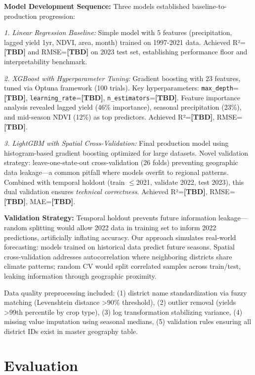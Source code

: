 \documentclass[10pt,a4paper]{article}
\begin{document}
\textbf{Model Development Sequence:}
Three models established baseline-to-production progression:

\textit{1. Linear Regression Baseline:} Simple model with 5 features (precipitation, lagged yield 1yr, NDVI, area, month) trained on 1997-2021 data. Achieved R²=\textbf{[TBD]} and RMSE=\textbf{[TBD]} on 2023 test set, establishing performance floor and interpretability benchmark.

\textit{2. XGBoost with Hyperparameter Tuning:} Gradient boosting with 23 features, tuned via Optuna framework (100 trials). Key hyperparameters: \texttt{max\_depth}=\textbf{[TBD]}, \texttt{learning\_rate}=\textbf{[TBD]}, \texttt{n\_estimators}=\textbf{[TBD]}. Feature importance analysis revealed lagged yield (46\% importance), seasonal precipitation (23\%), and mid-season NDVI (12\%) as top predictors. Achieved R²=\textbf{[TBD]}, RMSE=\textbf{[TBD]}.

\textit{3. LightGBM with Spatial Cross-Validation:} Final production model using histogram-based gradient boosting optimized for large datasets. Novel validation strategy: leave-one-state-out cross-validation (26 folds) preventing geographic data leakage—a common pitfall where models overfit to regional patterns. Combined with temporal holdout (train $\leq$2021, validate 2022, test 2023), this dual validation ensures \textit{technical correctness}. Achieved R²=\textbf{[TBD]}, RMSE=\textbf{[TBD]}, MAE=\textbf{[TBD]}.

\textbf{Validation Strategy:}
Temporal holdout prevents future information leakage—random splitting would allow 2022 data in training set to inform 2022 predictions, artificially inflating accuracy. Our approach simulates real-world forecasting: models trained on historical data predict future seasons. Spatial cross-validation addresses autocorrelation where neighboring districts share climate patterns; random CV would split correlated samples across train/test, leaking information through geographic proximity.

Data quality preprocessing included: (1) district name standardization via fuzzy matching (Levenshtein distance >90\% threshold), (2) outlier removal (yields >99th percentile by crop type), (3) log transformation stabilizing variance, (4) missing value imputation using seasonal medians, (5) validation rules ensuring all district IDs exist in master geography table.

\section{Evaluation}
\end{document}
